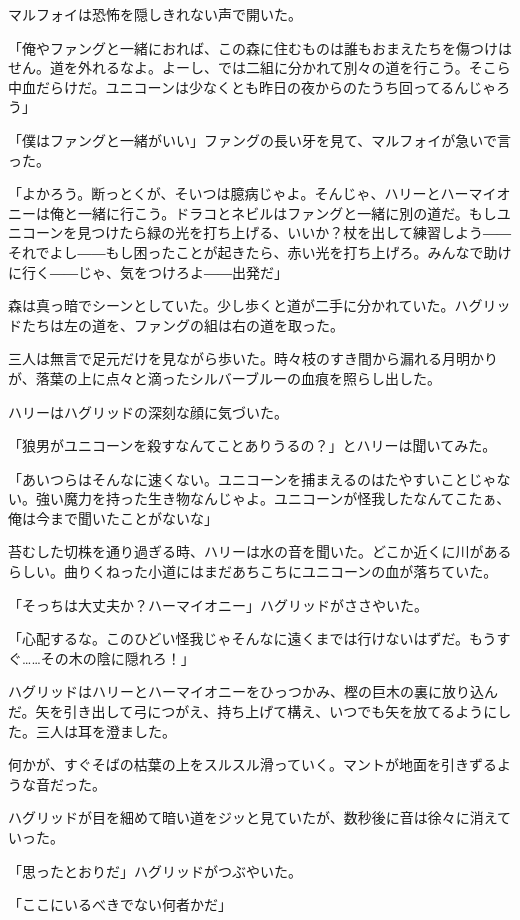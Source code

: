\documentclass[10pt,a4paper]{article}
\begin{document}
\begin{CJK}{UTF8}{min}
マルフォイは恐怖を隠しきれない声で開いた。

「俺やファングと一緒におれば、この森に住むものは誰もおまえたちを傷つけはせん。道を外れるなよ。よーし、では二組に分かれて別々の道を行こう。そこら中血だらけだ。ユニコーンは少なくとも昨日の夜からのたうち回ってるんじゃろう」

「僕はファングと一緒がいい」ファングの長い牙を見て、マルフォイが急いで言った。

「よかろう。断っとくが、そいつは臆病じゃよ。そんじゃ、ハリーとハーマイオニーは俺と一緒に行こう。ドラコとネビルはファングと一緒に別の道だ。もしユニコーンを見つけたら緑の光を打ち上げる、いいか？杖を出して練習しよう――それでよし――もし困ったことが起きたら、赤い光を打ち上げろ。みんなで助けに行く――じゃ、気をつけろよ――出発だ」

森は真っ暗でシーンとしていた。少し歩くと道が二手に分かれていた。ハグリッドたちは左の道を、ファングの組は右の道を取った。

三人は無言で足元だけを見ながら歩いた。時々枝のすき間から漏れる月明かりが、落葉の上に点々と滴ったシルバーブルーの血痕を照らし出した。

ハリーはハグリッドの深刻な顔に気づいた。

「狼男がユニコーンを殺すなんてことありうるの？」とハリーは聞いてみた。

「あいつらはそんなに速くない。ユニコーンを捕まえるのはたやすいことじゃない。強い魔力を持った生き物なんじゃよ。ユニコーンが怪我したなんてこたぁ、俺は今まで聞いたことがないな」

苔むした切株を通り過ぎる時、ハリーは水の音を聞いた。どこか近くに川があるらしい。曲りくねった小道にはまだあちこちにユニコーンの血が落ちていた。

「そっちは大丈夫か？ハーマイオニー」ハグリッドがささやいた。

「心配するな。このひどい怪我じゃそんなに遠くまでは行けないはずだ。もうすぐ……その木の陰に隠れろ！」

ハグリッドはハリーとハーマイオニーをひっつかみ、樫の巨木の裏に放り込んだ。矢を引き出して弓につがえ、持ち上げて構え、いつでも矢を放てるようにした。三人は耳を澄ました。

何かが、すぐそばの枯葉の上をスルスル滑っていく。マントが地面を引きずるような音だった。

ハグリッドが目を細めて暗い道をジッと見ていたが、数秒後に音は徐々に消えていった。

「思ったとおりだ」ハグリッドがつぶやいた。

「ここにいるべきでない何者かだ」


\end{CJK}
\end{document}
